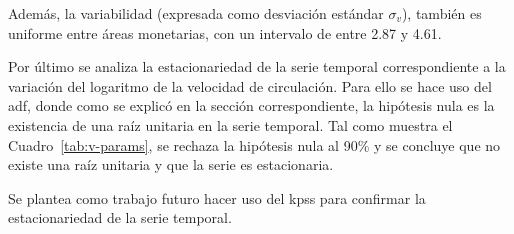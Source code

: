 \documentclass[titlepage, 12pt]{article}
\begin{document}
Además, la variabilidad (expresada como desviación estándar $\sigma_v$), también es uniforme entre áreas monetarias, con un intervalo de entre 2.87 y 4.61.

Por último se analiza la estacionariedad de la serie temporal correspondiente a la variación del logaritmo de la velocidad de circulación. Para ello se hace uso del \acrfull{adf}, donde como se explicó en la sección correspondiente, la hipótesis nula es la existencia de una raíz unitaria en la serie temporal. Tal como muestra el Cuadro~\ref{tab:v-params}, se rechaza la hipótesis nula al 90\% y se concluye que no existe una raíz unitaria y que la serie es estacionaria.

Se plantea como trabajo futuro hacer uso del \acrfull{kpss} para confirmar la estacionariedad de la serie temporal.
\end{document}
